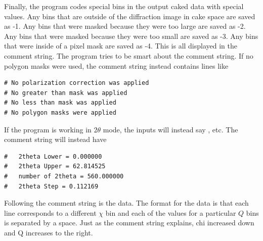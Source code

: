 Finally, the program codes special bins in the output caked data
with special values. Any bins that are outside of the diffraction
image in cake space are saved as -1. Any bins that were masked
because they were too large are saved as -2. Any bins that
were masked because they were too small are saved as -3. Any bins 
that were inside of a pixel mask are saved as -4. This is all
displayed in the comment string. The program tries to be smart about
the comment string. If no polygon masks were used, the comment string
instead contains lines like
\begin{lstlisting}[caption={'Alternate Header'}]
# No polarization correction was applied
# No greater than mask was applied
# No less than mask was applied
# No polygon masks were applied
\end{lstlisting}
If the program is working in $2\theta$ mode, the inputs will instead 
say , etc. The comment string will instead have
\begin{lstlisting}[caption={'Another Alternate Header'}]
#   2theta Lower = 0.000000
#   2theta Upper = 62.814525
#   number of 2theta = 560.000000
#   2theta Step = 0.112169
\end{lstlisting}
Following the comment string is the data. The format for the data is
that each line corresponds to a different $\chi$ bin and each of the 
values for a particular $Q$ bins is separated by a space. Just
as the comment string explains, chi increased down and Q increases to 
the right. 



